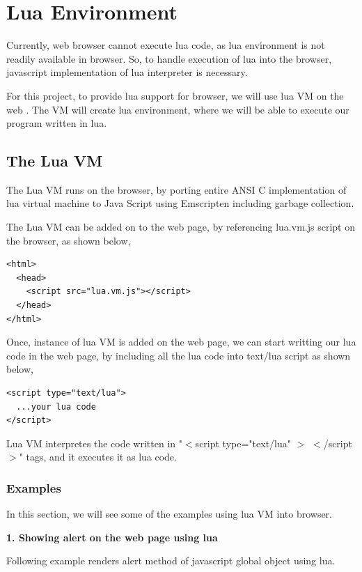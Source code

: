 \chapter{Lua Environment}

Currently, web browser cannot execute lua code, as lua environment is not readily available in browser. So, to handle execution of lua into the browser, javascript implementation of lua interpreter is necessary. 

For this project, to provide lua support for browser, we will use lua VM on the web \cite{luavm}. The VM will create lua environment, where we will be able to execute our program written in lua.

\section{The Lua VM}

The Lua VM runs on the browser, by porting entire ANSI C implementation of lua virtual machine to Java Script using Emscripten \cite{emscripten} including garbage collection.

The Lua VM can be added on to the web page, by referencing lua.vm.js script on the browser, as shown below, 


\begin{lstlisting}[frame=single]  
<html>
  <head>
    <script src="lua.vm.js"></script>
  </head>
</html>
\end{lstlisting}

Once, instance of lua VM is added on the web page, we can start writting our lua code in the web page, by including all the lua code into text/lua script as shown below, 

\begin{lstlisting}[frame=single]  
<script type="text/lua">
  ...your lua code
</script>
\end{lstlisting}

Lua VM interpretes the code written in "$<$script type="text/lua" $>$ $<$/script$>$" tags, and it executes it as lua code.

\subsection{Examples}

In this section, we will see some of the examples using lua VM into browser.

\textbf{1. Showing alert on the web page using lua}

Following example renders alert method of javascript global object using lua.  

